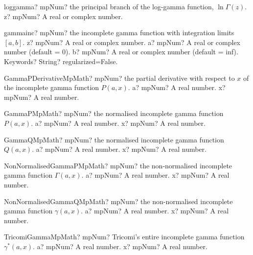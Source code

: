 \documentclass[12pt,a4paper,openany]{book}
\begin{document}
\begin{mpFunctionsExtract}
\mpFunctionOne
{loggamma? mpNum? the principal branch of the log-gamma function, $\ln\Gamma(z)$.}
{z? mpNum? A real or complex number.}
\end{mpFunctionsExtract}

\begin{mpFunctionsExtract}
\mpFunctionFour
{gammainc? mpNum? the incomplete gamma function with integration limits $[a, b]$.}
{z? mpNum? A real or complex number.}
{a? mpNum? A real or complex number (default = 0).}
{b? mpNum? A real or complex number (default = inf).}
{Keywords? String?  regularized=False.}
\end{mpFunctionsExtract}

\begin{mpFunctionsExtract}
\mpFunctionTwoNotImplemented
{GammaPDerivativeMpMath? mpNum? the partial derivative with respect to $x$ of the incomplete gamma function $P(a,x)$.}
{a? mpNum? A real number.}
{x? mpNum? A real number.}
\end{mpFunctionsExtract}

\begin{mpFunctionsExtract}
\mpFunctionTwoNotImplemented
{GammaPMpMath? mpNum? the normalised incomplete gamma function $P(a,x)$.}
{a? mpNum? A real number.}
{x? mpNum? A real number.}
\end{mpFunctionsExtract}

\begin{mpFunctionsExtract}
\mpFunctionTwoNotImplemented
{GammaQMpMath? mpNum? the normalised incomplete gamma function $Q(a,x)$.}
{a? mpNum? A real number.}
{x? mpNum? A real number.}
\end{mpFunctionsExtract}

\begin{mpFunctionsExtract}
\mpFunctionTwoNotImplemented
{NonNormalisedGammaPMpMath? mpNum? the non-normalised incomplete gamma function $\Gamma(a,x)$.}
{a? mpNum? A real number.}
{x? mpNum? A real number.}
\end{mpFunctionsExtract}

\begin{mpFunctionsExtract}
\mpFunctionTwoNotImplemented
{NonNormalisedGammaQMpMath? mpNum? the non-normalised incomplete gamma function $\gamma(a,x)$.}
{a? mpNum? A real number.}
{x? mpNum? A real number.}
\end{mpFunctionsExtract}

\begin{mpFunctionsExtract}
\mpFunctionTwoNotImplemented
{TricomiGammaMpMath? mpNum? Tricomi's entire incomplete gamma function $\gamma^*(a,x)$.}
{a? mpNum? A real number.}
{x? mpNum? A real number.}
\end{mpFunctionsExtract}
\end{document}
